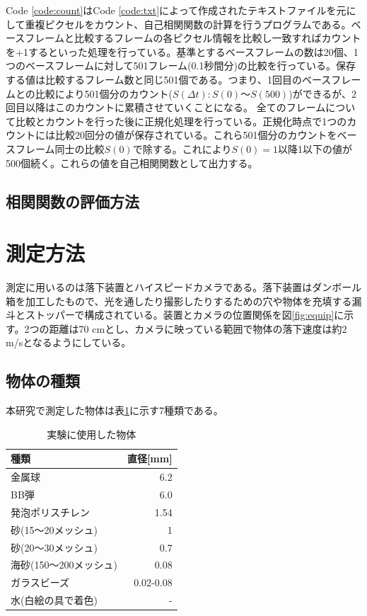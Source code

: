 \documentclass[a4paper,10pt,twocolumn,dvipdfmx]{jsarticle}
\newcommand{\Dt}{\Delta t}
\begin{document}

Code \ref{code:count}はCode \ref{code:txt}によって作成されたテキストファイルを元にして重複ピクセルをカウント、自己相関関数の計算を行うプログラムである。ベースフレームと比較するフレームの各ピクセル情報を比較し一致すればカウントを+1するといった処理を行っている。基準とするベースフレームの数は20個、1つのベースフレームに対して501フレーム(0.1秒間分)の比較を行っている。保存する値は比較するフレーム数と同じ501個である。つまり、1回目のベースフレームとの比較により501個分のカウント($S(\Dt):S(0)〜S(500)$)ができるが、2回目以降はこのカウントに累積させていくことになる。
全てのフレームについて比較とカウントを行った後に正規化処理を行っている。正規化時点で1つのカウントには比較20回分の値が保存されている。これら501個分のカウントをベースフレーム同士の比較$S(0)$で除する。これにより$S(0)=1$以降1以下の値が500個続く。これらの値を自己相関関数として出力する。

\subsection{相関関数の評価方法}

\section{測定方法}
測定に用いるのは落下装置とハイスピードカメラである。落下装置はダンボール箱を加工したもので、光を通したり撮影したりするための穴や物体を充填する漏斗とストッパーで構成されている。装置とカメラの位置関係を図\ref{fig:equip}に示す。2つの距離は70 cmとし、カメラに映っている範囲で物体の落下速度は約2 m/sとなるようにしている。
\subsection{物体の種類}
本研究で測定した物体は表\ref{tb:ballkind}に示す7種類である。 \\
\begin{table}[H]
	\caption{実験に使用した物体 \label{tb:ballkind}}
	\begin{tabular}{lr}
		\toprule
		種類 & 直径[mm] \\
		\midrule
		金属球 & 6.2 \\
		BB弾 & 6.0 \\
		発泡ポリスチレン & 1.54 \\
		砂(15〜20メッシュ) & 1 \\
		砂(20〜30メッシュ) & 0.7 \\
		海砂(150〜200メッシュ) & 0.08 \\
		ガラスビーズ & 0.02-0.08 \\
		水(白絵の具で着色) & - \\
		\bottomrule
	\end{tabular}
\end{table}
\end{document}
